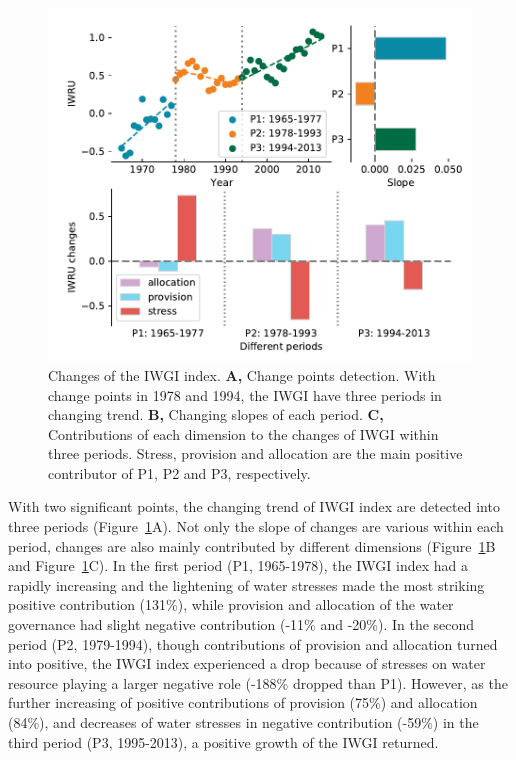 \documentclass[9pt, twocolumn, twoside, lineno]{pnas-new}
\begin{document}
\begin{figure}[ht!]
	\centering
	\includegraphics[width=\linewidth]{../../figures/main/index.pdf}
	\caption{Changes of the IWGI index. 
	\textbf{A,} Change points detection. With change points in 1978 and 1994, the IWGI have three periods in changing trend.
	\textbf{B,} Changing slopes of each period.
	\textbf{C,} Contributions of each dimension to the changes of IWGI within three periods. Stress, provision and allocation are the main positive contributor of P1, P2 and P3, respectively.
	}
	\label{fig:IWGI}
\end{figure}

With two significant points, the changing trend of IWGI index are detected into three periods (Figure~\ref{fig:IWGI}A). 
Not only the slope of changes are various within each period, changes are also mainly contributed by different dimensions (Figure~\ref{fig:IWGI}B and Figure~\ref{fig:IWGI}C).
In the first period (P1, 1965-1978), the IWGI index had a rapidly increasing and the lightening of water stresses made the most striking positive contribution (131\%), while provision and allocation of the water governance had slight negative contribution (-11\% and -20\%).
In the second period (P2, 1979-1994), though contributions of provision and allocation turned into positive, the IWGI index experienced a drop because of stresses on water resource playing a larger negative role (-188\% dropped than P1). 
However, as the further increasing of positive contributions of provision (75\%) and allocation (84\%), and decreases of water stresses in negative contribution (-59\%) in the third period (P3, 1995-2013), a positive growth of the IWGI returned.
\end{document}
